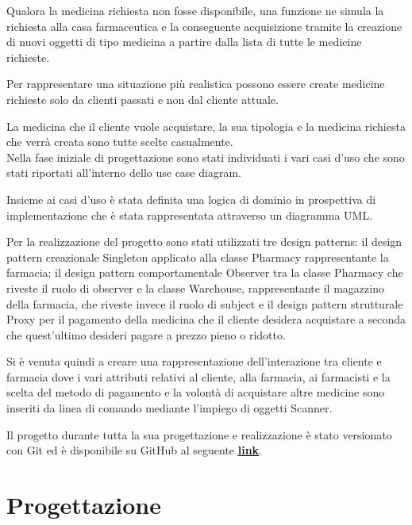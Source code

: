 \documentclass[a4paper, 10pt]{report}
\begin{document}
Qualora la medicina richiesta non fosse disponibile, una funzione ne simula la richiesta alla casa farmaceutica e la conseguente acquisizione tramite la creazione di nuovi oggetti di tipo medicina a partire dalla lista di tutte le medicine richieste.

Per rappresentare una situazione più realistica possono essere create medicine richieste solo da clienti passati e non dal cliente attuale.

La medicina che il cliente vuole acquistare, la sua tipologia e la medicina richiesta che verrà creata sono tutte scelte casualmente.\\

Nella fase iniziale di progettazione sono stati individuati i vari casi d'uso che sono stati riportati all'interno dello use case diagram.

Insieme ai casi d'uso è stata definita una logica di dominio in prospettiva di implementazione che è stata rappresentata attraverso un diagramma UML.

Per la realizzazione del progetto sono stati utilizzati tre design patterns: il design pattern creazionale Singleton applicato alla classe Pharmacy rappresentante la farmacia; il design pattern comportamentale Observer tra la classe Pharmacy che riveste il ruolo di observer e la classe Warehouse, rappresentante il magazzino della farmacia, che riveste invece il ruolo di subject e il design pattern strutturale Proxy per il pagamento della medicina che il cliente desidera acquistare a seconda che quest'ultimo desideri pagare a prezzo pieno o ridotto.

Si è venuta quindi a creare una rappresentazione dell'interazione tra cliente e farmacia dove i vari attributi relativi al cliente, alla farmacia, ai farmacisti e la scelta del metodo di pagamento e la volontà di acquistare altre medicine sono inseriti da linea di comando mediante l'impiego di oggetti Scanner.

Il progetto durante tutta la sua progettazione e realizzazione è stato versionato con Git ed è disponibile su GitHub al seguente \href{https://github.com/athos-innocenti/Pharmacy}{\underline{\textbf{link}}}.
\chapter{Progettazione}
\end{document}

